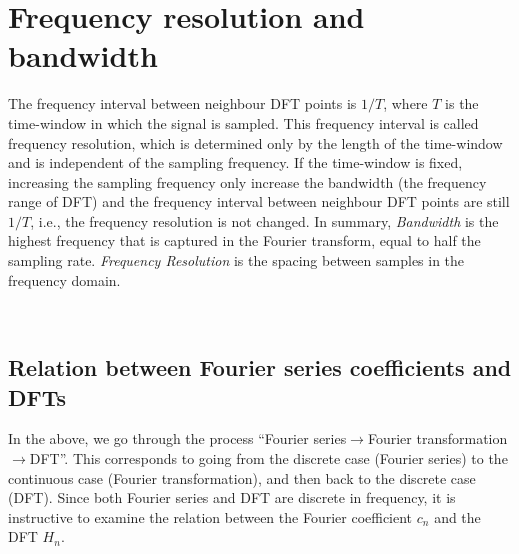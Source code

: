 \documentclass{article}
\newcommand{\tmem}[1]{{\em #1\/}}
\begin{document}
\section{Frequency resolution and bandwidth}

The frequency interval between neighbour DFT points is $1 / T$, where $T$ is
the time-window in which the signal is sampled. This frequency interval is
called frequency resolution, which is determined only by the length of the
time-window and is independent of the sampling frequency. If the time-window
is fixed, increasing the sampling frequency only increase the bandwidth (the
frequency range of DFT) and the frequency interval between neighbour DFT
points are still $1 / T$, i.e., the frequency resolution is not changed. In
summary, {\tmem{Bandwidth}} is the highest frequency that is captured in the
Fourier transform, equal to half the sampling rate. {\tmem{Frequency
Resolution}} is the spacing between samples in the frequency domain.

\

\subsection{Relation between Fourier series coefficients and DFTs}

In the above, we go through the process ``Fourier series$\rightarrow$Fourier
transformation $\rightarrow$DFT''. This corresponds to going from the discrete
case (Fourier series) to the continuous case (Fourier transformation), and
then back to the discrete case (DFT). Since both Fourier series and DFT are
discrete in frequency, it is instructive to examine the relation between the
Fourier coefficient $c_n$ and the DFT $H_n$.
\end{document}
